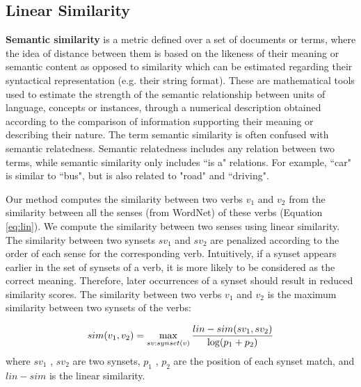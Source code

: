 \documentclass[document.tex]{subfiles}
\begin{document}
\begin{appendices}
        
        \chapter{Linear Similarity}
        
        \noindent \textbf{Semantic similarity} is a metric defined over a set of documents or terms, where the idea of distance between them is based on the likeness of their meaning or semantic content as opposed to similarity which can be estimated regarding their syntactical representation (e.g. their string format). These are mathematical tools used to estimate the strength of the semantic relationship between units of language, concepts or instances, through a numerical description obtained according to the comparison of information supporting their meaning or describing their nature. The term semantic similarity is often confused with semantic relatedness. Semantic relatedness includes any relation between two terms, while semantic similarity only includes ``is a" relations. For example, ``car" is similar to ``bus", but is also related to "road" and ``driving".
        
        
        Our method computes the similarity between
        two verbs $v_1$ and $v_2$ from the similarity between all
        the senses (from WordNet) of these verbs (Equation \ref{eq:lin}). We compute the similarity between two
        senses using linear similarity. The
        similarity between two synsets $sv_1$ and $sv_2$ are penalized according to the order of each sense for the
        corresponding verb. Intuitively, if a synset appears
        earlier in the set of synsets of a verb, it is more
        likely to be considered as the correct meaning.
        Therefore, later occurrences of a synset should result in reduced similarity scores. The similarity
        between two verbs $v_1$ and $v_2$ is the maximum similarity between two synsets of the verbs:
        
        \begin{equation}
        	sim(v_1, v_2) = \max_{sv:synset(v)}^{} {lin-sim(sv_1, sv_2)\over \log(p_1+p_2)}
        	\label{eq:lin}
        \end{equation}
        where $sv_1$ , $sv_2$ are two synsets, $p_1$ , $p_2$ are the position of each synset match, and $lin-sim$ is the linear similarity.
\end{appendices}
\end{document}
